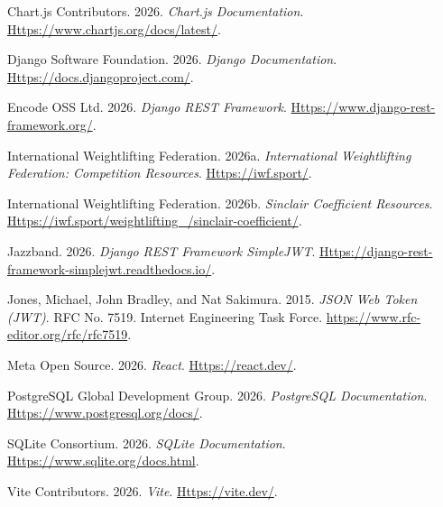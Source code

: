 \documentclass[
  letterpaper,
  DIV=11,
  numbers=noendperiod]{scrartcl}
\newlength{\cslhangindent}
\newenvironment{CSLReferences}[2] %
 {\begin{list}{}{%
  \setlength{\itemindent}{0pt}
  \setlength{\leftmargin}{0pt}
  \setlength{\parsep}{0pt}
  \ifodd #1
   \setlength{\leftmargin}{\cslhangindent}
   \setlength{\itemindent}{-1\cslhangindent}
  \fi
  \setlength{\itemsep}{#2\baselineskip}}}
 {\end{list}}
\begin{document}
\protect{}\label{refs}
\begin{CSLReferences}{1}{1}
Chart.js Contributors. 2026. \emph{Chart.js Documentation}.
\href{https://www.chartjs.org/docs/latest/}{Https://www.chartjs.org/docs/latest/}.

Django Software Foundation. 2026. \emph{Django Documentation}.
\href{https://docs.djangoproject.com/}{Https://docs.djangoproject.com/}.

Encode OSS Ltd. 2026. \emph{Django {REST} Framework}.
\href{https://www.django-rest-framework.org/}{Https://www.django-rest-framework.org/}.

International Weightlifting Federation. 2026a. \emph{International
Weightlifting Federation: Competition Resources}.
\href{https://iwf.sport/}{Https://iwf.sport/}.

International Weightlifting Federation. 2026b. \emph{Sinclair
Coefficient Resources}.
\href{https://iwf.sport/weightlifting_/sinclair-coefficient/}{Https://iwf.sport/weightlifting\_/sinclair-coefficient/}.

Jazzband. 2026. \emph{Django {REST} Framework {SimpleJWT}}.
\href{https://django-rest-framework-simplejwt.readthedocs.io/}{Https://django-rest-framework-simplejwt.readthedocs.io/}.

Jones, Michael, John Bradley, and Nat Sakimura. 2015. \emph{{JSON} Web
Token ({JWT})}. RFC No. 7519. Internet Engineering Task Force.
\url{https://www.rfc-editor.org/rfc/rfc7519}.

Meta Open Source. 2026. \emph{React}.
\href{https://react.dev/}{Https://react.dev/}.

PostgreSQL Global Development Group. 2026. \emph{{PostgreSQL}
Documentation}.
\href{https://www.postgresql.org/docs/}{Https://www.postgresql.org/docs/}.

SQLite Consortium. 2026. \emph{{SQLite} Documentation}.
\href{https://www.sqlite.org/docs.html}{Https://www.sqlite.org/docs.html}.

Vite Contributors. 2026. \emph{Vite}.
\href{https://vite.dev/}{Https://vite.dev/}.

\end{CSLReferences}
\end{document}
